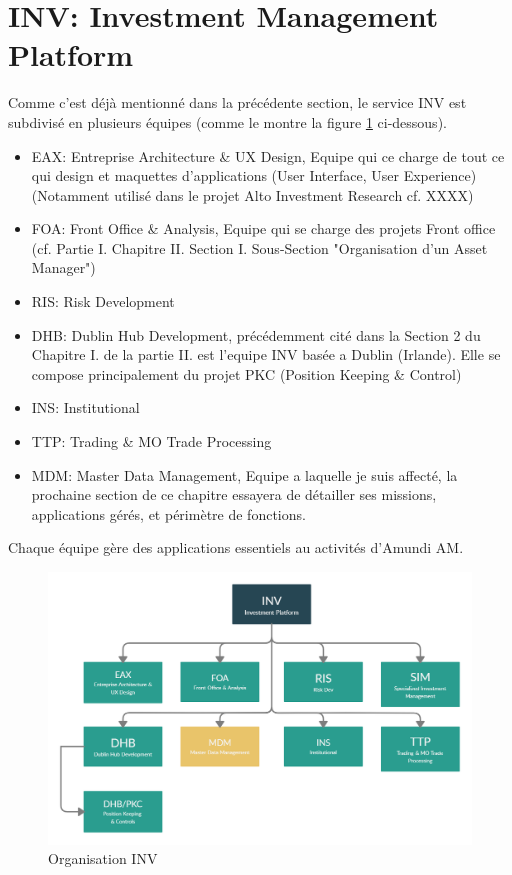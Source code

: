 \section{INV: Investment Management Platform}
\par Comme c'est déjà mentionné dans la précédente section, le service INV est subdivisé en plusieurs équipes (comme le montre la figure \ref{fig:inv} ci-dessous).\\
\begin{itemize}
    \item EAX: Entreprise Architecture \& UX Design, Equipe qui ce charge de tout ce qui design et maquettes d'applications (User Interface, User Experience) (Notamment utilisé dans le projet Alto Investment Research cf. XXXX) 
    \item FOA: Front Office \& Analysis, Equipe qui se charge des projets Front office (cf. Partie I. Chapitre II. Section I. Sous-Section "Organisation d'un Asset Manager")
    \item RIS: Risk Development
    \item DHB: Dublin Hub Development, précédemment cité dans la Section 2 du Chapitre I. de la partie II. est l'equipe INV basée a Dublin (Irlande). Elle se compose principalement du projet PKC (Position Keeping \& Control) 
    \item INS: Institutional 
    \item TTP: Trading \& MO Trade Processing 
    \item MDM: Master Data Management, Equipe a laquelle je suis affecté, la prochaine section de ce chapitre essayera de détailler ses missions, applications gérés, et périmètre de fonctions.
\end{itemize}
\par Chaque équipe gère des applications essentiels au activités d'Amundi AM.
\begin{figure}[ht]
    \includegraphics[width=\columnwidth]{img/Org INV.png}
    \caption{Organisation INV}
    \label{fig:inv}
\end{figure}

